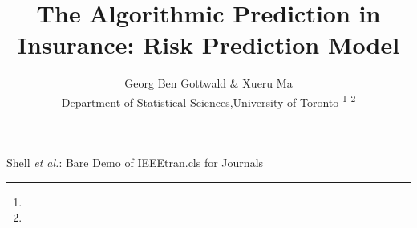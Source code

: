 \documentclass[journal]{IEEEtran}
\begin{document}
\title{The Algorithmic Prediction in Insurance: Risk Prediction Model }

\author{{Georg Ben Gottwald & Xueru Ma}%

 Department of Statistical Sciences,University of Toronto
\thanks{}%
\thanks{}}

\markboth{}%
{Shell \MakeLowercase{\textit{et al.}}: Bare Demo of IEEEtran.cls for Journals}




\maketitle

\end{document}
